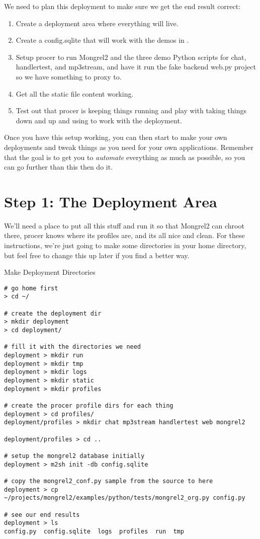 We need to plan this deployment to make sure we get the end result correct:

\begin{enumerate}
\item Create a deployment area where everything will live.
\item Create a config.sqlite that will work with the demos in .
\item Setup procer to run Mongrel2 and the three demo Python scripts for chat, handlertest, and mp3stream,
    and have it run the fake backend web.py project so we have something to proxy to.
\item Get all the static file content working.
\item Test out that procer is keeping things running and play with taking things down and up and using
     to work with the deployment.
\end{enumerate}

Once you have this setup working, you can then start to make your own
deployments and tweak things as you need for your own applications.  Remember
that the goal is to get you to \emph{automate} everything as much as possible,
so you can go further than this then do it.

\section{Step 1: The Deployment Area}

We'll need a place to put all this stuff and run it so that Mongrel2 can chroot
there, procer knows where its profiles are, and its all nice and clean.  For these
instructions, we're just going to make some directories in your home directory,
but feel free to change this up later if you find a better way.

\begin{code}{Make Deployment Directories}
\begin{Verbatim}
# go home first
> cd ~/

# create the deployment dir
> mkdir deployment
> cd deployment/

# fill it with the directories we need
deployment > mkdir run
deployment > mkdir tmp
deployment > mkdir logs
deployment > mkdir static
deployment > mkdir profiles

# create the procer profile dirs for each thing
deployment > cd profiles/
deployment/profiles > mkdir chat mp3stream handlertest web mongrel2

deployment/profiles > cd ..

# setup the mongrel2 database initially
deployment > m2sh init -db config.sqlite

# copy the mongrel2_conf.py sample from the source to here
deployment > cp ~/projects/mongrel2/examples/python/tests/mongrel2_org.py config.py

# see our end results
deployment > ls
config.py  config.sqlite  logs	profiles  run  tmp

\end{Verbatim}
\end{code}

